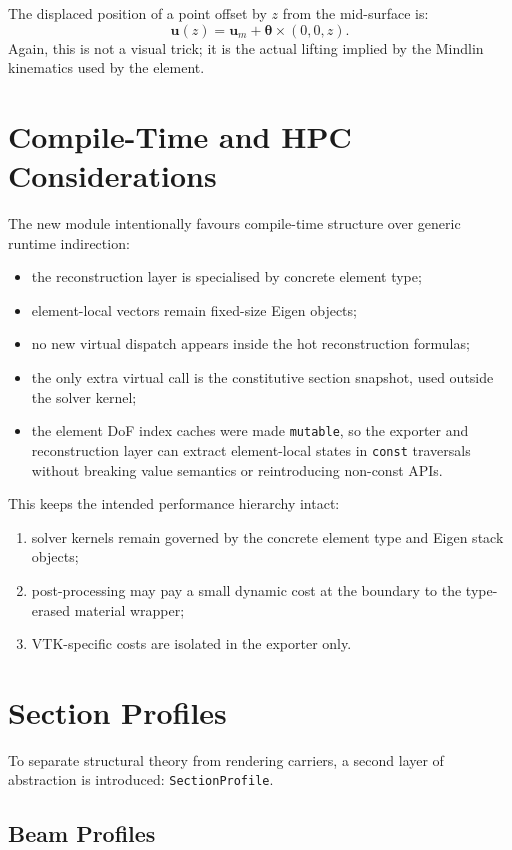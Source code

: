 The displaced position of a point offset by $z$ from the mid-surface is:
\[
\mathbf{u}(z) = \mathbf{u}_m + \boldsymbol{\theta}\times(0,0,z).
\]
Again, this is not a visual trick; it is the actual lifting implied by the
Mindlin kinematics used by the element.

\section{Compile-Time and HPC Considerations}

The new module intentionally favours compile-time structure over generic
runtime indirection:
\begin{itemize}
  \item the reconstruction layer is specialised by concrete element type;
  \item element-local vectors remain fixed-size Eigen objects;
  \item no new virtual dispatch appears inside the hot reconstruction formulas;
  \item the only extra virtual call is the constitutive section snapshot, used
        outside the solver kernel;
  \item the element DoF index caches were made \texttt{mutable}, so the
        exporter and reconstruction layer can extract element-local states in
        \texttt{const} traversals without breaking value semantics or
        reintroducing non-const APIs.
\end{itemize}

This keeps the intended performance hierarchy intact:
\begin{enumerate}
  \item solver kernels remain governed by the concrete element type and Eigen
        stack objects;
  \item post-processing may pay a small dynamic cost at the boundary to the
        type-erased material wrapper;
  \item VTK-specific costs are isolated in the exporter only.
\end{enumerate}

\section{Section Profiles}

To separate structural theory from rendering carriers, a second layer of
abstraction is introduced: \texttt{SectionProfile}.

\subsection{Beam Profiles}

